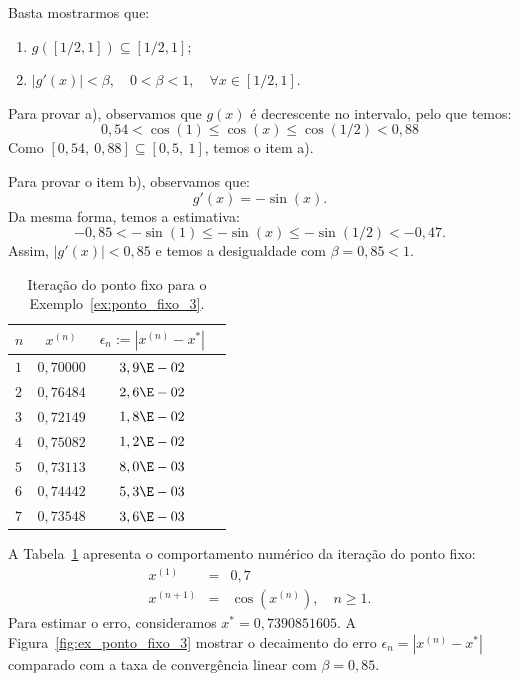 \begin{sol}
  Basta mostrarmos que:
  \begin{enumerate}
  \item[a)] $g\left([1/2,1]\right) \subseteq [1/2,1]$;
  \item[b)] $|g'(x)|<\beta, \quad 0<\beta<1,\quad \forall x\in [1/2,1]$.
  \end{enumerate}

Para provar a), observamos que $g(x)$ é decrescente no intervalo, pelo que temos:
\begin{equation}
  0,54<\cos(1)\leq \cos(x)\leq \cos(1/2)<0,88
\end{equation}
Como $[0,54,~0,88]\subseteq [0,5,~1]$, temos o item a).

Para provar o item b), observamos que:
\begin{equation}
  g'(x) = -\sin(x).
\end{equation}
Da mesma forma, temos a estimativa:
\begin{equation}
  -0,85<-\sin(1) \leq -\sin(x)\leq -\sin(1/2)<-0,47.
\end{equation}
Assim, $|g'(x)|<0,85$ e temos a desigualdade com $\beta=0,85<1$.

\begin{table}
  \centering
  \begin{tabular}{l|ccc}\hline
   $n$ & $x^{(n)}$ & $\epsilon_n := |x^{(n)} - x^*|$ \\\hline
   $1$ & $0,70000$ & $3,9\E-02$ \\
   $2$ & $0,76484$ & $2,6\E-02$ \\
   $3$ & $0,72149$ & $1,8\E-02$ \\
   $4$ & $0,75082$ & $1,2\E-02$ \\
   $5$ & $0,73113$ & $8,0\E-03$ \\
   $6$ & $0,74442$ & $5,3\E-03$ \\
   $7$ & $0,73548$ & $3,6\E-03$ \\\hline
  \end{tabular}
  \caption{Iteração do ponto fixo para o Exemplo~\ref{ex:ponto_fixo_3}.}
  \label{tab:ponto_fixo_3}
\end{table}


A Tabela~\ref{tab:ponto_fixo_3} apresenta o comportamento numérico da iteração do ponto fixo:
\begin{eqnarray}
x^{(1)} &=& 0,7\\
x^{(n+1)} &=& \cos(x^{(n)}),\quad n\geq 1.
\end{eqnarray}
Para estimar o erro, consideramos $x^* = 0,7390851605$. A Figura~\ref{fig:ex_ponto_fixo_3} mostrar o decaimento do erro $\epsilon_n = |x^{(n)} - x^*|$ comparado com a taxa de convergência linear com $\beta = 0,85$.


\end{sol}
